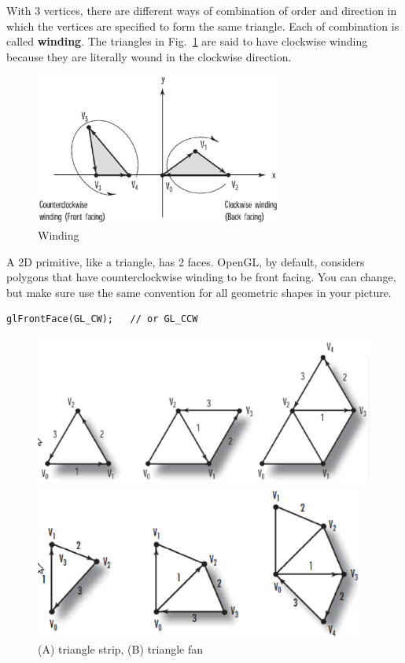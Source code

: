 With 3 vertices, there are different ways of combination of order and
direction in which the vertices are specified to form the same
triangle. Each of combination is called {\bf winding}. The triangles
in Fig.~\ref{fig:winding} are said to have clockwise winding because they are
literally wound in the clockwise direction.

\begin{figure}[hbt]
  \centerline{\includegraphics[height=5cm,
    angle=0]{./images/winding.eps}}
  \caption{Winding}
  \label{fig:winding}
\end{figure}

A 2D primitive, like a triangle, has 2 faces.  OpenGL, by default,
considers polygons that have counterclockwise winding to be front
facing. You can change, but make sure use the same convention for all
geometric shapes in your picture.
\begin{verbatim}
glFrontFace(GL_CW);   // or GL_CCW
\end{verbatim}

\begin{figure}[hbt]
  \centerline{\includegraphics[height=5cm,
    angle=0]{./images/triangle_strip.eps}}
  \centerline{\includegraphics[height=5cm,
    angle=0]{./images/triangle_fan.eps}}

  \caption{(A) triangle strip, (B) triangle fan}
  \label{fig:triangle}
\end{figure}





